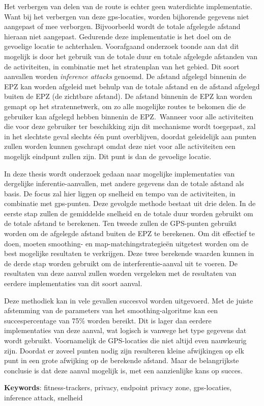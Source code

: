 Het verbergen van delen van de route is echter geen waterdichte implementatie.
Want bij het verbergen van deze gps-locaties, worden bijhorende gegevens niet
aangepast of mee verborgen. Bijvoorbeeld wordt de totale afgelegde afstand
hieraan niet aangepast. Gedurende deze implementatie is het doel om de
gevoelige locatie te achterhalen. Voorafgaand onderzoek toonde aan dat dit
mogelijk is door het gebruik van de totale duur en totale afgelegde afstanden
van de activiteiten, in combinatie met het stratenplan van het gebied. Dit
soort aanvallen worden \textit{inference attacks} genoemd. De afstand afgelegd
binnenin de EPZ kan worden afgeleid met behulp van de totale afstand en de
afstand afgelegd buiten de EPZ (de zichtbare afstand). De afstand binnenin de
EPZ kan worden gemapt op het stratennetwerk, om zo alle mogelijke routes te
bekomen die de gebruiker kan afgelegd hebben binnenin de EPZ.\ Wanneer voor
alle activiteiten die voor deze gebruiker ter beschikking zijn dit mechanisme
wordt toegepast, zal in het slechtste geval slechts één punt overblijven,
doordat geleidelijk aan punten zullen worden kunnen geschrapt omdat deze niet
voor alle activiteiten een mogelijk eindpunt zullen zijn. Dit punt is dan de
gevoelige locatie.

In deze thesis wordt onderzoek gedaan naar mogelijke implementaties van
dergelijke inferentie-aanvallen, met andere gegevens dan de totale afstand als
basis. De focus zal hier liggen op snelheid en tempo van de activiteiten, in
combinatie met gps-punten. Deze gevolgde methode bestaat uit drie delen. In de
eerste stap zullen de gemiddelde snelheid en de totale duur worden gebruikt om
de totale afstand te berekenen. Ten tweede zullen de GPS-punten gebruikt worden
om de afgelegde afstand buiten de \ac{EPZ} te berekenen. Om dit effectief te
doen, moeten smoothing- en map-matchingstrategieën uitgetest worden om de best
mogelijke resultaten te verkrijgen. Deze twee berekende waarden kunnen in de
derde stap worden gebruikt om de interferentie-aanval uit te voeren. De
resultaten van deze aanval zullen worden vergeleken met de resultaten van
eerdere implementaties van dit soort aanval.

Deze methodiek kan in vele gevallen succesvol worden uitgevoerd. Met de juiste
afstemming van de parameters van het smoothing-algoritme kan een
succespercentage van 75\% worden bereikt. Dit is lager dan eerdere
implementaties van deze aanval, wat logisch is vanwege het type gegevens dat
wordt gebruikt. Voornamelijk de GPS-locaties die niet altijd even nauwkeurig
zijn. Doordat er zoveel punten nodig zijn resulteren kleine afwijkingen op elk
punt in een grote afwijking op de berekende afstand. Maar de belangrijkste
conclusie is dat deze aanval mogelijk is, met een aanzienlijke kans op succes.

\textbf{Keywords}: fitness-trackers, privacy, endpoint privacy zone,
\ac{gps}-locaties, inference attack, snelheid